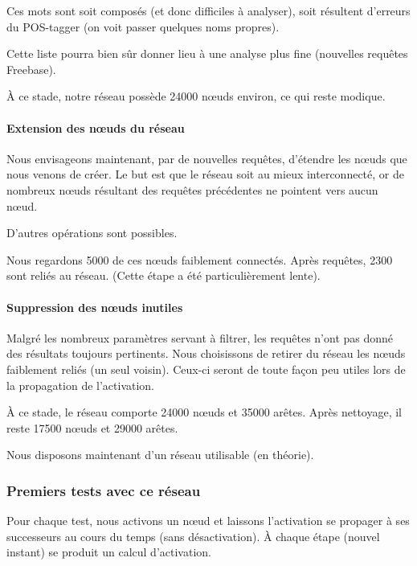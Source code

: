 \documentclass[a4paper, 12pt]{article}
\begin{document}
Ces mots sont soit composés (et donc difficiles à analyser), soit résultent d'erreurs du POS-tagger (on voit passer quelques noms propres).

Cette liste pourra bien sûr donner lieu à une analyse plus fine (nouvelles requêtes Freebase).

\`A ce stade, notre réseau possède 24000 nœuds environ, ce qui reste modique.

\paragraph{Extension des nœuds du réseau}

Nous envisageons maintenant, par de nouvelles requêtes, d'étendre les nœuds que nous venons de créer. Le but est que le réseau soit au mieux interconnecté, or de nombreux nœuds résultant des requêtes précédentes ne pointent vers aucun nœud.

D'autres opérations sont possibles.

Nous regardons 5000 de ces nœuds faiblement connectés. Après requêtes, 2300 sont reliés au réseau. (Cette étape a été particulièrement lente).

\paragraph{Suppression des nœuds inutiles}

Malgré les nombreux paramètres servant à filtrer, les requêtes n'ont pas donné des résultats toujours pertinents. Nous choisissons de retirer du réseau les nœuds faiblement reliés (un seul voisin). Ceux-ci seront de toute fa\c{c}on peu utiles lors de la propagation de l'activation.

\`A  ce stade, le réseau comporte 24000 nœuds et 35000 arêtes. Après nettoyage, il reste 17500 nœuds et 29000 arêtes.

Nous disposons maintenant d'un réseau utilisable (en théorie).

\subsubsection{Premiers tests avec ce réseau}

Pour chaque test, nous activons un nœud et laissons l'activation se propager à ses successeurs au cours du temps (sans désactivation). \`A chaque étape (nouvel instant) se produit un calcul d'activation.
\end{document}
